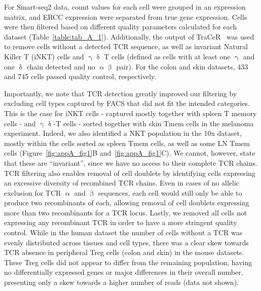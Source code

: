 For Smart-seq2 data, count values for each cell were grouped in an expression matrix, and ERCC expression were separated from true gene expression. Cells were then filtered based on different quality parameters calculated for each dataset (Table~\ref{table:tab_A_1}). Additionally, the output of TraCeR~\citep{stubbington_t_2016} was used to remove cells without a detected TCR sequence, as well as invariant Natural Killer T (iNKT) cells and ${\upgamma\updelta}$ T cells (defined as cells with at least one ${\upgamma}$ and one ${\updelta}$ chain detected and no ${\upalpha\upbeta}$ pair). For the colon and skin datasets, 433 and 745 cells passed quality control, respectively.

Importantly, we note that TCR detection greatly improved our filtering by excluding cell types captured by FACS that did not fit the intended categories. This is the case for iNKT cells - captured mostly together with spleen T memory cells - and ${\upgamma\updelta}$-T cells - sorted together with skin Tmem cells in the melanoma experiment. Indeed, we also identified a NKT population in the 10x dataset, mostly within the cells sorted as spleen Tmem cells, as well as some LN Tmem cells (Figure~\ref{fig:appA_fig1}B and~\ref{fig:appA_fig1}C). We cannot, however, state that these are “invariant”, since we have no access to their complete TCR chains. TCR filtering also enables removal of cell doublets by identifying cells expressing an excessive diversity of recombined TCR chains. Even in cases of no allelic exclusion for TCR ${\upalpha}$ and ${\upbeta}$ sequences, each cell would still only be able to produce two recombinants of each, allowing removal of cell doublets expressing more than two recombinants for a TCR locus. Lastly, we removed all cells not expressing any recombinant TCR in order to have a more stringent quality control. While in the human dataset the number of cells without a TCR was evenly distributed across tissues and cell types, there was a clear skew towards TCR absence in peripheral Treg cells (colon and skin) in the mouse datasets. These Treg cells did not appear to differ from the remaining population, having no differentially expressed genes or major differences in their overall number, presenting only a skew towards a higher number of reads (data not shown).


